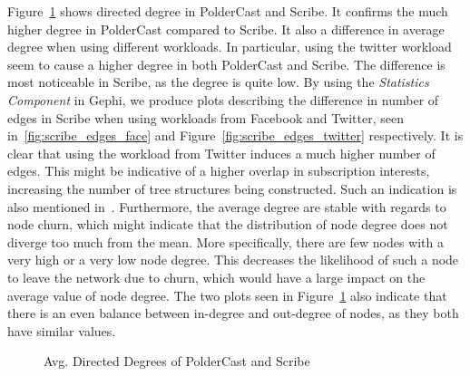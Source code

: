 Figure~\ref{fig:eval_directeddegree} shows
directed degree in PolderCast and Scribe. It confirms the much higher
degree in PolderCast compared to Scribe. It also a difference in average
degree when using different workloads. In particular, using the twitter
workload seem to cause a higher degree in both PolderCast and Scribe.
The difference is most noticeable in Scribe, as the degree is quite low.
By using the \emph{Statistics Component} in Gephi, we produce plots
describing the difference in number of edges in Scribe when using
workloads from Facebook and Twitter, seen in~\ref{fig:scribe_edges_face}
and Figure~\ref{fig:scribe_edges_twitter} respectively. It is clear that
using the workload from Twitter induces a much higher number of edges.
This might be indicative of a higher overlap in subscription interests,
increasing the number of tree structures being constructed. Such an
indication is also mentioned in~\cite{Setty:2012}. Furthermore, the
average degree are stable with regards to node churn, which might
indicate that the distribution of node degree does not diverge too much
from the mean. More specifically, there are few nodes with a very high
or a very low node degree. This decreases the likelihood of such a node
to leave the network due to churn, which would have a large impact on
the average value of node degree. The two plots seen in
Figure~\ref{fig:eval_directeddegree} also indicate that there is an even
balance between in-degree and out-degree of nodes, as they both have
similar values.

\begin{figure}[H]
    \centering
        
        \label{fig:eval_indegree}
        
        \label{fig:eval_outdegree}
    \caption{Avg. Directed Degrees of PolderCast and Scribe}
    \label{fig:eval_directeddegree}
\end{figure}

